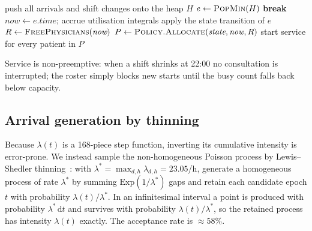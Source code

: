 \documentclass[sigconf,nonacm]{acmart}
\begin{document}
\begin{algorithm}[t]
\caption{Discrete-event main loop}
\label{alg:loop}
\begin{algorithmic}[1]
\State push all arrivals and shift changes onto the heap $H$
  \State $e \gets \textsc{PopMin}(H)$
   \textbf{break} \EndIf
  \State $\textit{now} \gets e.\textit{time}$; accrue utilisation integrals
  \State apply the state transition of $e$
  \State $R \gets \textsc{FreePhysicians}(\textit{now})$
    \State $P \gets \textsc{Policy.Allocate}(\textit{state},\textit{now},R)$
    \State start service for every patient in $P$
  \EndIf
\EndWhile
\end{algorithmic}
\end{algorithm}

Service is non-preemptive: when a shift shrinks at 22:00 no consultation is
interrupted; the roster simply blocks new starts until the busy count falls
back below capacity.

\subsection{Arrival generation by thinning}
Because $\lambda(t)$ is a 168-piece step function, inverting its cumulative
intensity is error-prone. We instead sample the non-homogeneous Poisson process
by Lewis--Shedler thinning~\cite{lewis1979thinning}: with
$\lambda^{*}=\max_{d,h}\lambda_{d,h}=23.05$/h, generate a homogeneous process of
rate $\lambda^{*}$ by summing $\mathrm{Exp}(1/\lambda^{*})$ gaps and retain each
candidate epoch $t$ with probability $\lambda(t)/\lambda^{*}$. In an
infinitesimal interval a point is produced with probability
$\lambda^{*}\,\mathrm{d}t$ and survives with probability
$\lambda(t)/\lambda^{*}$, so the retained process has intensity
$\lambda(t)$ exactly. The acceptance rate is $\approx 58\%$.
\end{document}
